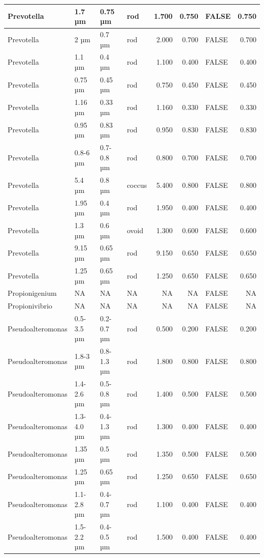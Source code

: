 \documentclass[
]{article}
\begin{document}
\begin{table}
\begin{tabular}{l|l|l|l|r|r|l|r}
\hline
Prevotella & 1.7 µm & 0.75 µm & rod & 1.700 & 0.750 & FALSE & 0.750\\
\hline
Prevotella & 2 µm & 0.7 µm & rod & 2.000 & 0.700 & FALSE & 0.700\\
\hline
Prevotella & 1.1 µm & 0.4 µm & rod & 1.100 & 0.400 & FALSE & 0.400\\
\hline
Prevotella & 0.75 µm & 0.45 µm & rod & 0.750 & 0.450 & FALSE & 0.450\\
\hline
Prevotella & 1.16 µm & 0.33 µm & rod & 1.160 & 0.330 & FALSE & 0.330\\
\hline
Prevotella & 0.95 µm & 0.83 µm & rod & 0.950 & 0.830 & FALSE & 0.830\\
\hline
Prevotella & 0.8-6 µm & 0.7-0.8 µm & rod & 0.800 & 0.700 & FALSE & 0.700\\
\hline
Prevotella & 5.4 µm & 0.8 µm & coccus & 5.400 & 0.800 & FALSE & 0.800\\
\hline
Prevotella & 1.95 µm & 0.4 µm & rod & 1.950 & 0.400 & FALSE & 0.400\\
\hline
Prevotella & 1.3 µm & 0.6 µm & ovoid & 1.300 & 0.600 & FALSE & 0.600\\
\hline
Prevotella & 9.15 µm & 0.65 µm & rod & 9.150 & 0.650 & FALSE & 0.650\\
\hline
Prevotella & 1.25 µm & 0.65 µm & rod & 1.250 & 0.650 & FALSE & 0.650\\
\hline
Propionigenium & NA & NA & NA & NA & NA & FALSE & NA\\
\hline
Propionivibrio & NA & NA & NA & NA & NA & FALSE & NA\\
\hline
Pseudoalteromonas & 0.5-3.5 µm & 0.2-0.7 µm & rod & 0.500 & 0.200 & FALSE & 0.200\\
\hline
Pseudoalteromonas & 1.8-3 µm & 0.8-1.3 µm & rod & 1.800 & 0.800 & FALSE & 0.800\\
\hline
Pseudoalteromonas & 1.4-2.6 µm & 0.5-0.8 µm & rod & 1.400 & 0.500 & FALSE & 0.500\\
\hline
Pseudoalteromonas & 1.3-4.0 µm & 0.4-1.3 µm & rod & 1.300 & 0.400 & FALSE & 0.400\\
\hline
Pseudoalteromonas & 1.35 µm & 0.5 µm & rod & 1.350 & 0.500 & FALSE & 0.500\\
\hline
Pseudoalteromonas & 1.25 µm & 0.65 µm & rod & 1.250 & 0.650 & FALSE & 0.650\\
\hline
Pseudoalteromonas & 1.1-2.8 µm & 0.4-0.7 µm & rod & 1.100 & 0.400 & FALSE & 0.400\\
\hline
Pseudoalteromonas & 1.5-2.2 µm & 0.4-0.5 µm & rod & 1.500 & 0.400 & FALSE & 0.400\\

\end{tabular}
\end{table}
\end{document}

